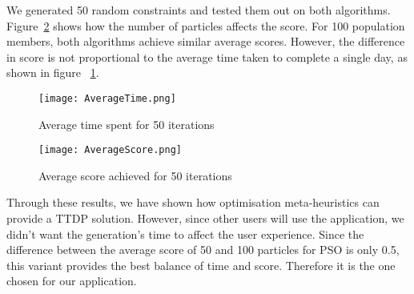 We generated 50 random constraints and tested them out
on both algorithms. Figure~\ref{AverageScore} shows how the number of
particles affects the score. For 100 population
members, both algorithms achieve similar average
scores. However, the difference in score is not
proportional to the average time taken to complete a
single day, as shown in figure ~\ref{AverageTime}.

\begin{figure}[h]
\centering
\texttt{[image: AverageTime.png]}
\caption{Average time spent for 50 iterations}
\label{AverageTime}
\end{figure}

\begin{figure}[h]
\centering
\texttt{[image: AverageScore.png]}
\caption{Average score achieved for 50 iterations}
\label{AverageScore}
\end{figure}


Through these results, we have shown how optimisation
meta-heuristics can provide a TTDP solution. However,
since other users will use the application, we didn't
want the generation's time to affect the user
experience. Since the difference between the average
score of 50 and 100 particles for PSO is only 0.5,
this variant provides the best balance of time and
score. Therefore it is the one chosen for our
application.   

